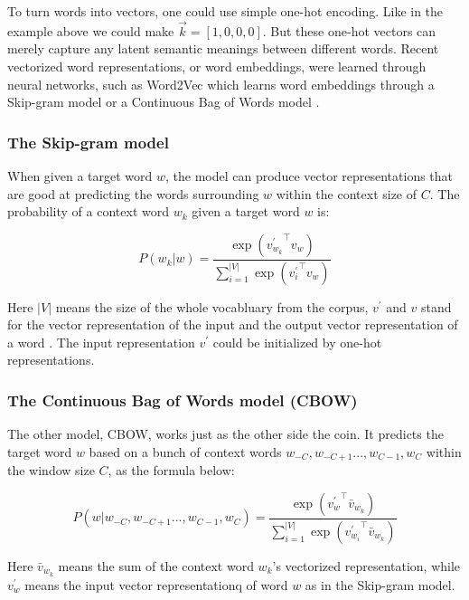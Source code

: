 \documentclass[thesis,fonts=libertine]{cluu}
\begin{document}
To turn words into vectors, one could use simple one-hot encoding. Like in the example above we could make $\vec{k}=[1, 0, 0, 0]$. But these one-hot vectors can merely capture any latent semantic meanings between different words. Recent vectorized word representations, or word embeddings, were learned through neural networks, such as Word2Vec which learns word embeddings through a Skip-gram model or a Continuous Bag of Words model \parencite{Mikolov:2013ab}.

\subsubsection{The Skip-gram model}

When given a target word $w$, the model can produce vector representations that are good at predicting the words surrounding $w$ within the context size of $C$. The probability of a context word $w_k$ given a target word $w$ is:

\begin{equation}
  P(w_k|w)=\frac{\exp({v_{w_k}^\prime}^\intercal v_w)}{\sum_{i=1}^{|V|}\exp({v^\prime_i}^\intercal v_w)}
\end{equation}

Here $|V|$ means the size of the whole vocabluary from the corpus, $v^\prime$ and $v$ stand for the vector representation of the input and the output vector representation of a word \parencite{Mikolov:2013aa}. The input representation $v^\prime$ could be initialized by one-hot representations.

\subsubsection{The Continuous Bag of Words model (CBOW)}

The other model, CBOW, works just as the other side the coin. It predicts the target word $w$ based on a bunch of context words $w_{-C}, w_{-C+1} ..., w_{C-1}, w_C$ within the window size $C$, as the formula below:

\begin{equation}
  P(w|w_{-C}, w_{-C+1} ..., w_{C-1}, w_C)=\frac{\exp({v^\prime_w}^\intercal \bar{v}_{w_k})}{\sum^{|V|}_{i=1}\exp({v^\prime_{w_i}}^\intercal \bar{v}_{w_k})}
\end{equation}

Here $\bar{v}_{w_k}$ means the sum of the context word $w_k$'s vectorized representation, while $v^\prime_w$ means the input vector representationq of word $w$ as in the Skip-gram model. 
\end{document}
